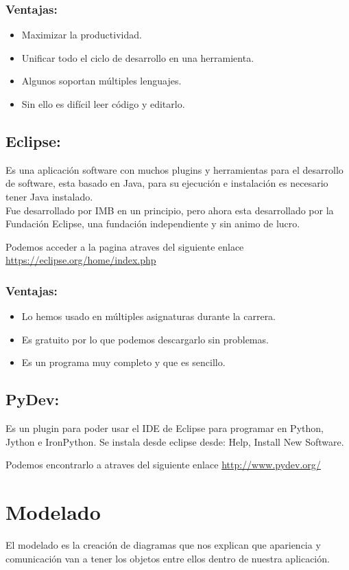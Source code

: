 \subsubsection{Ventajas:}
\begin{itemize}
	\item Maximizar la productividad.
	\item Unificar todo el ciclo de desarrollo en una herramienta.
	\item Algunos soportan múltiples lenguajes. 
	\item Sin ello es difícil leer código y editarlo.
\end{itemize}

\subsection{Eclipse:}
Es una aplicación software con muchos plugins y herramientas para el desarrollo de software, esta basado en Java, para su ejecución e instalación es necesario tener Java instalado.\\
Fue desarrollado por IMB en un principio, pero ahora esta desarrollado por la Fundación Eclipse, una fundación independiente y sin animo de lucro.


Podemos acceder a la pagina atraves del siguiente enlace  \url{https://eclipse.org/home/index.php}

\subsubsection{Ventajas:}
\begin{itemize}
	\item Lo hemos usado en múltiples asignaturas durante la carrera.
	\item Es gratuito por lo que podemos descargarlo sin problemas.
	\item Es un programa muy completo y que es sencillo.
\end{itemize}

\subsection{PyDev:}
Es un plugin para poder usar el IDE de Eclipse para programar en Python, Jython e IronPython.
Se instala desde eclipse desde: Help, Install New Software.

Podemos encontrarlo a atraves del siguiente enlace \url{http://www.pydev.org/}

\section{Modelado}
El modelado es la creación de diagramas que nos explican que apariencia y comunicación van a tener los objetos entre ellos dentro de nuestra aplicación.

